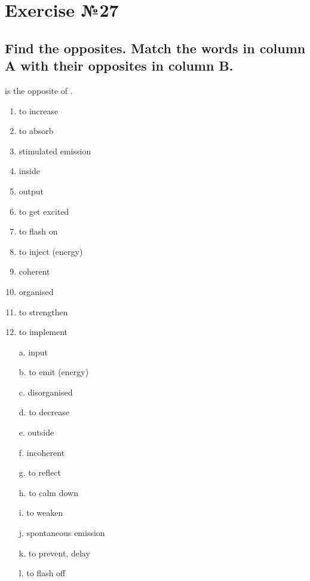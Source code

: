\section*{Exercise №27}
\subsection*{Find the opposites. Match the words in column A with their opposites in
      column B.}
 is the opposite of .

\begin{enumerate}
      \item to increase
      \item to absorb
      \item stimulated emission
      \item inside
      \item output
      \item to get excited
      \item to flash on
      \item to inject (energy)
      \item coherent
      \item organised
      \item to strengthen
      \item to implement \\
\end{enumerate}

\begin{enumerate}
      \item[a.] input
      \item[b.] to emit (energy)
      \item[c.] disorganised
      \item[d.] to decrease
      \item[e.] outside
      \item[f.] incoherent
      \item[g.] to reflect
      \item[h.] to calm down
      \item[i.] to weaken
      \item[j.] spontaneous emission
      \item[k.] to prevent, delay
      \item[l.] to flash off
\end{enumerate}

